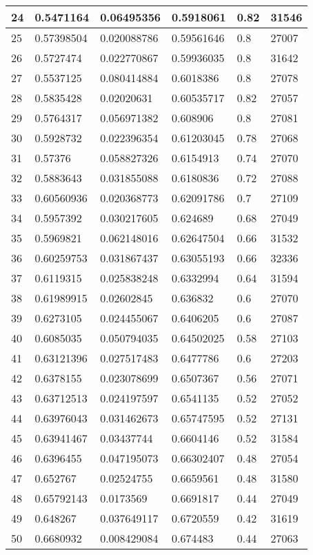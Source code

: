 \begin{longtable}{|l|l|l|l|l|l|}
24 & 0.5471164 & 0.06495356 & 0.5918061 & 0.82 & 31546 \\ \hline 
25 & 0.57398504 & 0.020088786 & 0.59561646 & 0.8 & 27007 \\ \hline 
26 & 0.5727474 & 0.022770867 & 0.59936035 & 0.8 & 31642 \\ \hline 
27 & 0.5537125 & 0.080414884 & 0.6018386 & 0.8 & 27078 \\ \hline 
28 & 0.5835428 & 0.02020631 & 0.60535717 & 0.82 & 27057 \\ \hline 
29 & 0.5764317 & 0.056971382 & 0.608906 & 0.8 & 27081 \\ \hline 
30 & 0.5928732 & 0.022396354 & 0.61203045 & 0.78 & 27068 \\ \hline 
31 & 0.57376 & 0.058827326 & 0.6154913 & 0.74 & 27070 \\ \hline 
32 & 0.5883643 & 0.031855088 & 0.6180836 & 0.72 & 27088 \\ \hline 
33 & 0.60560936 & 0.020368773 & 0.62091786 & 0.7 & 27109 \\ \hline 
34 & 0.5957392 & 0.030217605 & 0.624689 & 0.68 & 27049 \\ \hline 
35 & 0.5969821 & 0.062148016 & 0.62647504 & 0.66 & 31532 \\ \hline 
36 & 0.60259753 & 0.031867437 & 0.63055193 & 0.66 & 32336 \\ \hline 
37 & 0.6119315 & 0.025838248 & 0.6332994 & 0.64 & 31594 \\ \hline 
38 & 0.61989915 & 0.02602845 & 0.636832 & 0.6 & 27070 \\ \hline 
39 & 0.6273105 & 0.024455067 & 0.6406205 & 0.6 & 27087 \\ \hline 
40 & 0.6085035 & 0.050794035 & 0.64502025 & 0.58 & 27103 \\ \hline 
41 & 0.63121396 & 0.027517483 & 0.6477786 & 0.6 & 27203 \\ \hline 
42 & 0.6378155 & 0.023078699 & 0.6507367 & 0.56 & 27071 \\ \hline 
43 & 0.63712513 & 0.024197597 & 0.6541135 & 0.52 & 27052 \\ \hline 
44 & 0.63976043 & 0.031462673 & 0.65747595 & 0.52 & 27131 \\ \hline 
45 & 0.63941467 & 0.03437744 & 0.6604146 & 0.52 & 31584 \\ \hline 
46 & 0.6396455 & 0.047195073 & 0.66302407 & 0.48 & 27054 \\ \hline 
47 & 0.652767 & 0.02524755 & 0.6659561 & 0.48 & 31580 \\ \hline 
48 & 0.65792143 & 0.0173569 & 0.6691817 & 0.44 & 27049 \\ \hline 
49 & 0.648267 & 0.037649117 & 0.6720559 & 0.42 & 31619 \\ \hline 
50 & 0.6680932 & 0.008429084 & 0.674483 & 0.44 & 27063 \\ \hline 
\end{longtable}